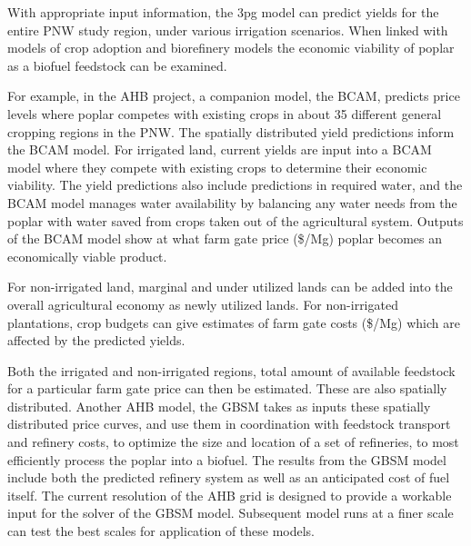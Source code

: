 \documentclass[preprint,review,12pt]{elsarticle}
\begin{document}
With appropriate input information, the \ac{3pg} model can predict
yields for the entire \ac{PNW} study region, under various irrigation
scenarios.  When linked with models of crop adoption and biorefinery
models the economic viability of poplar as a biofuel feedstock can be
examined.
 
For example, in the \ac{AHB} project, a companion model, the
\acf{BCAM}, predicts price levels where poplar competes with existing
crops in about 35 different general cropping regions in the \ac{PNW}.
The spatially distributed yield predictions inform the \ac{BCAM}
model.  For irrigated land, current yields are input into a \ac{BCAM}
model where they compete with existing crops to determine their
economic viability.  The yield predictions also include predictions in
required water, and the \ac{BCAM} model manages water availability by
balancing any water needs from the poplar with water saved from crops
taken out of the agricultural system.  Outputs of the \ac{BCAM} model
show at what farm gate price (\$/Mg) poplar becomes an economically
viable product.
 
For non-irrigated land, marginal and under utilized lands can be added
into the overall agricultural economy as newly utilized lands.  For
non-irrigated plantations, crop budgets can give estimates of farm gate
costs (\$/Mg) which are affected by the predicted yields.

Both the irrigated and non-irrigated regions, total amount of available
feedstock for a particular farm gate price can then be estimated.
These are also spatially distributed.  Another \ac{AHB} model, the
\acf{GBSM} takes as inputs these spatially distributed price curves,
 and use them in coordination with feedstock transport and refinery
costs, to optimize the size and location of a set of refineries, to
most efficiently process the poplar into a biofuel.  The results from
the \ac{GBSM} model include both the predicted refinery system as well
as an anticipated cost of fuel itself.  The current resolution of the
\ac{AHB} grid is designed to provide a workable input for the solver
of the \ac{GBSM} model.  Subsequent model runs at a finer scale can
test the best scales for application of these models.
\end{document}
